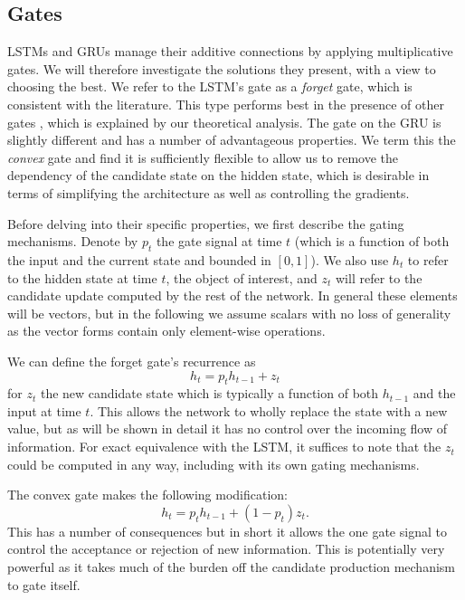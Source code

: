 \subsection{Gates}
LSTMs and GRUs manage their additive connections by applying multiplicative gates. We will therefore
investigate the solutions they present, with a view to choosing the best. We refer to the LSTM's gate
as a \emph{forget} gate, which is consistent with the literature. This type performs best
 in the presence of other gates \autocite{Greff2016, Jozefowicz2015}, which is explained by our 
 theoretical analysis.
The gate on the GRU is slightly
different and has a number of advantageous properties. We term this the \emph{convex} gate and find it
is sufficiently flexible to allow us to remove the dependency of the candidate state on the hidden
state, which is desirable in terms of simplifying the architecture as well as controlling the gradients.

Before delving into their specific properties, we first describe the gating mechanisms.
Denote by \(p_t\) the gate signal at time \(t\) (which is a
function of both the input and the current state and bounded in \([0, 1]\)). We also use
\(h_t\) to refer to the hidden state at time \(t\), the object of interest, and \(z_t\) will
refer to the candidate update computed by the rest of the network. In general these
elements will be vectors, but in the following we assume scalars with no loss of generality as
the vector forms contain only element-wise operations.

We can define the
forget gate's recurrence as
\begin{equation}
	h_t = p_th_{t-1} + z_t
	\label{eq:forgetgate}
\end{equation} for \(z_t\) the new candidate state which is typically a function of
both \(h_{t-1}\) and the input at time \(t\). This allows the network to wholly replace the
state with a new value, but as will be shown in detail it has no control over the incoming
flow of information. For exact equivalence with the LSTM, it suffices to note that the \(z_t\)
could be computed in any way, including with its own gating mechanisms.

The convex gate makes the following modification:
\begin{equation}
	h_t = p_th_{t-1} + (1-p_t)z_t.
	\label{eq:cvexgate}
\end{equation} This has a number of consequences but in short it allows the one gate signal
to control the acceptance or rejection of new information. This is potentially very powerful as
it takes much of the burden off the candidate production mechanism to gate itself.

